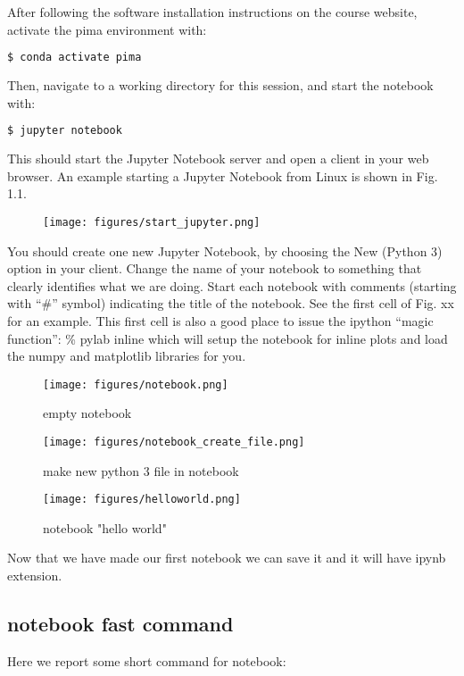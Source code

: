 \documentclass[11pt]{book}
\begin{document}
After following the software installation instructions on the course website, activate the pima environment with:

\begin{lstlisting}[language=bash]
  $ conda activate pima
\end{lstlisting}

Then, navigate to a working directory for this session, and start the notebook with:

\begin{lstlisting}[language=bash]
$ jupyter notebook
\end{lstlisting}

This should start the Jupyter Notebook server and open a client in your web browser.  An example starting a Jupyter Notebook from Linux is shown in Fig. 1.1.

\begin{figure}[!]
\texttt{[image: figures/start\_jupyter.png]}
\end{figure}

You should create one new Jupyter Notebook, by choosing the New (Python 3) option in your client.  Change the name of your notebook to something that clearly identifies what we are doing.  Start each notebook with comments (starting with “\#” symbol) indicating the title of the notebook.  See the first cell of Fig. xx for an example.  This first cell is also a good place to issue the ipython “magic function”: \%{} pylab inline which will setup the notebook for inline plots and load the numpy and matplotlib libraries for you.

\begin{figure}[!]
\texttt{[image: figures/notebook.png]}
\caption{empty notebook}
\end{figure}

\begin{figure}[!]
\texttt{[image: figures/notebook\_create\_file.png]}
\caption{make new python 3 file in notebook}
\end{figure}

\begin{figure}[!]
\texttt{[image: figures/helloworld.png]}
\caption{notebook "hello world"}
\end{figure}

Now that we have made our first notebook we can save it and it will have ipynb extension.


\subsection{notebook fast command}
Here we report some short command for notebook:
\end{document}
